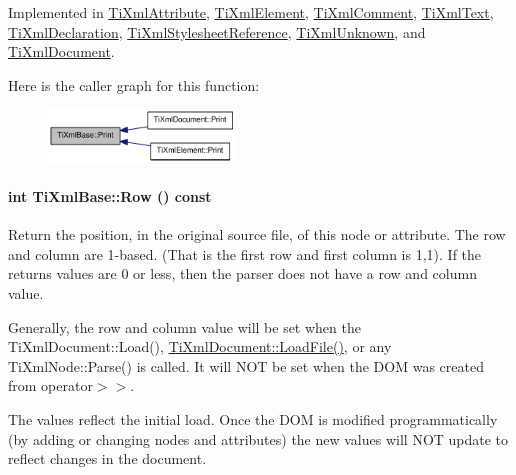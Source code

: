 Implemented in \hyperlink{class_ti_xml_attribute_acc04956c1d5c4c31fe74f7a7528d109a}{TiXmlAttribute}, \hyperlink{class_ti_xml_element_ad9d0c008866982ab8d9aafae7e14d692}{TiXmlElement}, \hyperlink{class_ti_xml_comment_a17398061d62c470f57801ce28fa33ad4}{TiXmlComment}, \hyperlink{class_ti_xml_text_ae74d56c5b3ddec6cc3103dd51821af92}{TiXmlText}, \hyperlink{class_ti_xml_declaration_abf6303db4bd05b5be554036817ff1cb4}{TiXmlDeclaration}, \hyperlink{class_ti_xml_stylesheet_reference_a49db8b6b92877c4afec7d20c307b9c6b}{TiXmlStylesheetReference}, \hyperlink{class_ti_xml_unknown_a025f19c21ef01ea9be50febb8fe0ba06}{TiXmlUnknown}, and \hyperlink{class_ti_xml_document_a7b1aea204fee266b70b9c105c8bf2ada}{TiXmlDocument}.

Here is the caller graph for this function:\nopagebreak
\begin{figure}[H]
\begin{center}
\leavevmode
\includegraphics[width=141pt]{class_ti_xml_base_a0de56b3f2ef14c65091a3b916437b512_icgraph}
\end{center}
\end{figure}
\hypertarget{class_ti_xml_base_a024bceb070188df92c2a8d8852dd0853}{
\paragraph[{Row}]{\setlength{\rightskip}{0pt plus 5cm}int TiXmlBase::Row () const}\hfill}
\label{class_ti_xml_base_a024bceb070188df92c2a8d8852dd0853}
Return the position, in the original source file, of this node or attribute. The row and column are 1-\/based. (That is the first row and first column is 1,1). If the returns values are 0 or less, then the parser does not have a row and column value.

Generally, the row and column value will be set when the TiXmlDocument::Load(), \hyperlink{class_ti_xml_document_a4c852a889c02cf251117fd1d9fe1845f}{TiXmlDocument::LoadFile()}, or any TiXmlNode::Parse() is called. It will NOT be set when the DOM was created from operator$>$$>$.

The values reflect the initial load. Once the DOM is modified programmatically (by adding or changing nodes and attributes) the new values will NOT update to reflect changes in the document.

